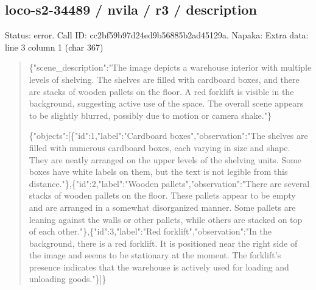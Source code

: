 \documentclass[10pt,a4paper]{article}
\begin{document}
\subsection*{loco-s2-34489 / nvila / r3 / description}
Status: error. Call ID: cc2bf59b97d24ed9b56885b2ad45129a. Napaka: Extra data: line 3 column 1 (char 367)
\begin{quote}\footnotesize
\{"scene\_description":\allowbreak{}"The image depicts a warehouse interior with multiple levels of shelving. The shelves are filled with cardboard boxes,\allowbreak{} and there are stacks of wooden pallets on the floor. A red forklift is visible in the background,\allowbreak{} suggesting active use of the space. The overall scene appears to be slightly blurred,\allowbreak{} possibly due to motion or camera shake."\}\par
\par
\{"objects":\allowbreak{}[\{"id":\allowbreak{}1,\allowbreak{}"label":\allowbreak{}"Car\allowbreak{}dboard boxes",\allowbreak{}"observation":\allowbreak{}"The shelves are filled with numerous cardboard boxes,\allowbreak{} each varying in size and shape. They are neatly arranged on the upper levels of the shelving units. Some boxes have white labels on them,\allowbreak{} but the text is not legible from this distance."\},\allowbreak{}\{"id":\allowbreak{}2,\allowbreak{}"label":\allowbreak{}"Woo\allowbreak{}den pallets",\allowbreak{}"observation":\allowbreak{}"There are several stacks of wooden pallets on the floor. These pallets appear to be empty and are arranged in a somewhat disorganized manner. Some pallets are leaning against the walls or other pallets,\allowbreak{} while others are stacked on top of each other."\},\allowbreak{}\{"id":\allowbreak{}3,\allowbreak{}"label":\allowbreak{}"Red forklift",\allowbreak{}"observation":\allowbreak{}"In the background,\allowbreak{} there is a red forklift. It is positioned near the right side of the image and seems to be stationary at the moment. The forklift's presence indicates that the warehouse is actively used for loading and unloading goods."\}]\}
\end{quote}
\end{document}
